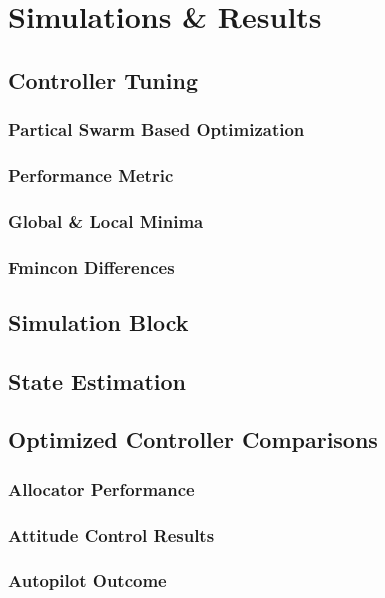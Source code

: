 \chapter{Simulations \& Results}
\label{ch:simulation}
\section{Controller Tuning}
\label{sec:simulation.tuning}
\subsection{Partical Swarm Based Optimization}
\label{subsec:simulation.tuning.pso}
\subsection{Performance Metric}
\label{subsec:simulation.tuning.metric}
\subsection{Global \& Local Minima}
\subsection{Fmincon Differences}

\section{Simulation Block}
\label{sec:simulation.block}
\section{State Estimation}
\label{sec:simulation.state}
\section{Optimized Controller Comparisons}
\label{sec:simulation.comparison}
\subsection{Allocator Performance}
\subsection{Attitude Control Results}
\subsection{Autopilot Outcome}
